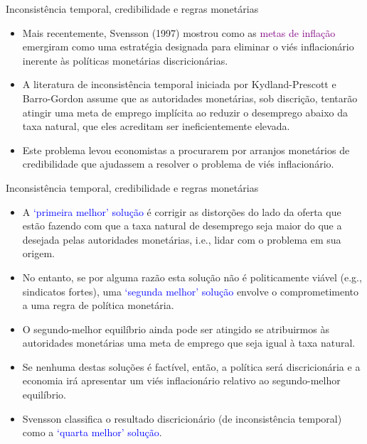 \documentclass[10pt]{beamer}
\begin{document}
\begin{frame}{Inconsistência temporal, credibilidade e regras monetárias}
    \begin{itemize}
        \item Mais recentemente, Svensson (1997) mostrou como as \textcolor{purple}{metas de inflação} emergiram como uma estratégia designada para eliminar o viés inflacionário inerente às políticas monetárias discricionárias.
        \bigskip
        \item A literatura de inconsistência temporal iniciada por Kydland-Prescott e Barro-Gordon assume que as autoridades monetárias, sob discrição, tentarão atingir uma meta de emprego implícita ao reduzir o desemprego abaixo da taxa natural, que eles acreditam ser ineficientemente elevada.
        \bigskip
        \item Este problema levou economistas a procurarem por arranjos monetários de credibilidade que ajudassem a resolver o problema de viés inflacionário.
    \end{itemize}
\end{frame}

\begin{frame}{Inconsistência temporal, credibilidade e regras monetárias}
    \begin{itemize}
        \item A \textcolor{blue}{`primeira melhor' solução} é corrigir as distorções do lado da oferta que estão fazendo com que a taxa natural de desemprego seja maior do que a desejada pelas autoridades monetárias, i.e., lidar com o problema em sua origem.
        \bigskip
        \item No entanto, se por alguma razão esta solução não é politicamente viável (e.g., sindicatos fortes), uma \textcolor{blue}{`segunda melhor' solução} envolve o comprometimento a uma regra de política monetária.
        \bigskip
        \item O segundo-melhor equilíbrio ainda pode ser atingido se atribuirmos às autoridades monetárias uma meta de emprego que seja igual à taxa natural.
        \bigskip
        \item Se nenhuma destas soluções é factível, então, a política será discricionária e a economia irá apresentar um viés inflacionário relativo ao segundo-melhor equilíbrio.
        \bigskip
        \item Svensson classifica o resultado discricionário (de inconsistência temporal) como a \textcolor{blue}{`quarta melhor' solução}.
    \end{itemize}
\end{frame}
\end{document}

